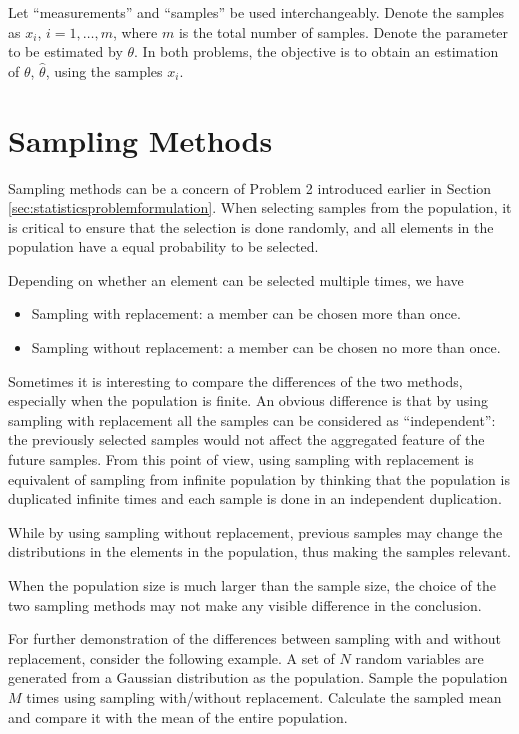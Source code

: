 Let ``measurements'' and ``samples'' be used interchangeably. Denote the samples as $x_i$, $i=1,\ldots,m$, where $m$ is the total number of samples. Denote the parameter to be estimated by $\theta$. In both problems, the objective is to obtain an estimation of $\theta$, $\hat{\theta}$, using the samples $x_i$. 

\section{Sampling Methods}

Sampling methods can be a concern of Problem 2 introduced earlier in Section \ref{sec:statisticsproblemformulation}. 
When selecting samples from the population, it is critical to ensure that the selection is done randomly, and all elements in the population have a equal probability to be selected. 

Depending on whether an element can be selected multiple times, we have
\begin{itemize}
  \item Sampling with replacement: a member can be chosen more than once.
  \item Sampling without replacement: a member can be chosen no more than once.
\end{itemize}
Sometimes it is interesting to compare the differences of the two methods, especially when the population is finite. An obvious difference is that by using sampling with replacement all the samples can be considered as ``independent'': the previously selected samples would not affect the aggregated feature of the future samples. From this point of view, using sampling with replacement is equivalent of sampling from infinite population by thinking that the population is duplicated infinite times and each sample is done in an independent duplication.

While by using sampling without replacement, previous samples may change the distributions in the elements in the population, thus making the samples relevant. 

When the population size is much larger than the sample size, the choice of the two sampling methods may not make any visible difference in the conclusion.

For further demonstration of the differences between sampling with and without replacement, consider the following example. A set of $N$ random variables are generated from a Gaussian distribution as the population. Sample the population $M$ times using sampling with/without replacement. Calculate the sampled mean and compare it with the mean of the entire population.

